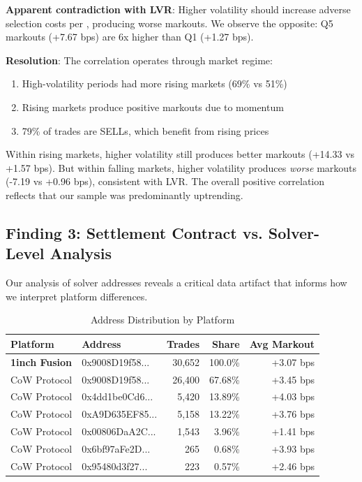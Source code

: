 \documentclass[12pt,a4paper]{article}
\begin{document}
\textbf{Apparent contradiction with LVR}: Higher volatility should increase adverse selection costs per \cite{milionis2022}, producing worse markouts. We observe the opposite: Q5 markouts (+7.67 bps) are 6x higher than Q1 (+1.27 bps).

\textbf{Resolution}: The correlation operates through market regime:
\begin{enumerate}
    \item High-volatility periods had more rising markets (69\% vs 51\%)
    \item Rising markets produce positive markouts due to momentum
    \item 79\% of trades are SELLs, which benefit from rising prices
\end{enumerate}

Within rising markets, higher volatility still produces better markouts (+14.33 vs +1.57 bps). But within falling markets, higher volatility produces \textit{worse} markouts (-7.19 vs +0.96 bps), consistent with LVR. The overall positive correlation reflects that our sample was predominantly uptrending.

\subsection{Finding 3: Settlement Contract vs. Solver-Level Analysis}

Our analysis of solver addresses reveals a critical data artifact that informs how we interpret platform differences.

\begin{table}[H]
\centering
\caption{Address Distribution by Platform}
\label{tab:addresses}
\begin{tabular}{llrrr}
\toprule
\textbf{Platform} & \textbf{Address} & \textbf{Trades} & \textbf{Share} & \textbf{Avg Markout} \\
\midrule
\textbf{1inch Fusion} & 0x9008D19f58... & 30,652 & 100.0\% & +3.07 bps \\
\midrule
CoW Protocol & 0x9008D19f58... & 26,400 & 67.68\% & +3.45 bps \\
CoW Protocol & 0x4dd1be0Cd6... & 5,420 & 13.89\% & +4.03 bps \\
CoW Protocol & 0xA9D635EF85... & 5,158 & 13.22\% & +3.76 bps \\
CoW Protocol & 0x00806DaA2C... & 1,543 & 3.96\% & +1.41 bps \\
CoW Protocol & 0x6bf97aFe2D... & 265 & 0.68\% & +3.93 bps \\
CoW Protocol & 0x95480d3f27... & 223 & 0.57\% & +2.46 bps \\
\bottomrule
\end{tabular}
\end{table}
\end{document}
